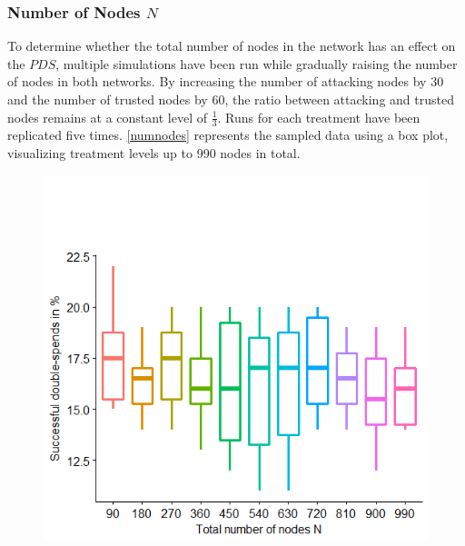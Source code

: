 \documentclass[a4paper,12pt,twoside]{report}
\begin{document}
\subsubsection{Number of Nodes $N$}
To determine whether the total number of nodes in the network has an effect on the $PDS$, multiple simulations have been run while gradually raising the number of nodes in both networks. By increasing the number of attacking nodes by 30 and the number of trusted nodes by 60, the ratio between attacking and trusted nodes remains at a constant level of $\frac{1}{3}$. Runs for each treatment have been replicated five times. \autoref{numnodes} represents the sampled data using a box plot, visualizing treatment levels up to 990 nodes in total.
\begin{figure}
\centering
\begin{minipage}{.5\textwidth}
  \centering
  \includegraphics[width=\linewidth]{Experiments/numnodes.png}
  \label{numnodes}
\end{minipage}%
\begin{minipage}{.5\textwidth}
  \centering

\end{minipage}
\end{figure}
\end{document}
